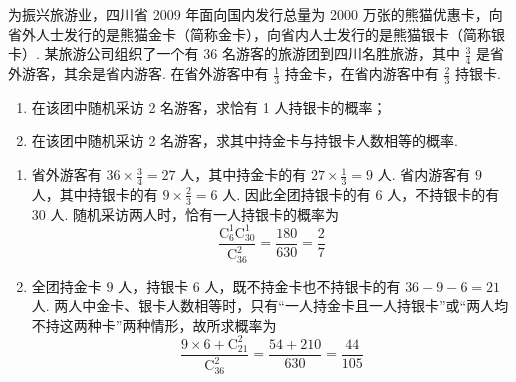 \begin{problem}
为振兴旅游业，四川省 2009 年面向国内发行总量为 2000 万张的熊猫优惠卡，向省外人士发行的是熊猫金卡（简称金卡），向省内人士发行的是熊猫银卡（简称银卡）. 某旅游公司组织了一个有 \(36\) 名游客的旅游团到四川名胜旅游，其中 \(\frac{3}{4}\) 是省外游客，其余是省内游客. 在省外游客中有 \(\frac{1}{3}\) 持金卡，在省内游客中有 \(\frac{2}{3}\) 持银卡.

\begin{enumerate}
\item 在该团中随机采访 2 名游客，求恰有 1 人持银卡的概率；
\item 在该团中随机采访 2 名游客，求其中持金卡与持银卡人数相等的概率.
\end{enumerate}
\begin{solution}
\begin{enumerate}
\item 省外游客有 \(36\times\frac34=27\) 人，其中持金卡的有
\(27\times\frac13=9\) 人. 省内游客有 \(9\) 人，其中持银卡的有
\(9\times\frac23=6\) 人. 因此全团持银卡的有 \(6\) 人，不持银卡的有 \(30\) 人.
随机采访两人时，恰有一人持银卡的概率为
\[
\frac{\mathrm C_6^1\mathrm C_{30}^1}{\mathrm C_{36}^2}
=\frac{180}{630}=\frac27
\]

\item 全团持金卡 \(9\) 人，持银卡 \(6\) 人，既不持金卡也不持银卡的有
\(36-9-6=21\) 人. 两人中金卡、银卡人数相等时，只有“一人持金卡且一人持银卡”或“两人均不持这两种卡”两种情形，故所求概率为
\[
\frac{9\times6+\mathrm C_{21}^2}{\mathrm C_{36}^2}
=\frac{54+210}{630}=\frac{44}{105}
\]
\end{enumerate}
\end{solution}
\end{problem}

